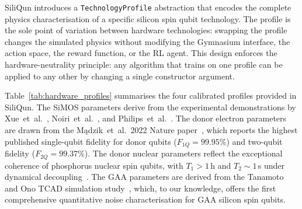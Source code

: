 SiliQun introduces a \texttt{TechnologyProfile} abstraction that
encodes the complete physics characterisation of a specific silicon spin
qubit technology.
The profile is the sole point of variation between hardware technologies:
swapping the profile changes the simulated physics without modifying the
Gymnasium interface, the action space, the reward function, or the RL
agent.
This design enforces the hardware-neutrality principle: any algorithm
that trains on one profile can be applied to any other by changing a
single constructor argument.

Table~\ref{tab:hardware_profiles} summarises the four calibrated profiles
provided in SiliQun.
The SiMOS parameters derive from the experimental demonstrations by
Xue~et~al.~\cite{Xue2022}, Noiri~et~al.~\cite{Noiri2022}, and
Philips~et~al.~\cite{Philips2022}.
The donor electron parameters are drawn from the M\k{a}dzik~et~al.\ 2022
Nature paper~\cite{Madzik2022}, which reports the highest published
single-qubit fidelity for donor qubits ($F_{1Q} = 99.95\%$) and
two-qubit fidelity ($F_{2Q} = 99.37\%$).
The donor nuclear parameters reflect the exceptional coherence of
phosphorus nuclear spin qubits, with $T_1 > 1$\,h and $T_2 \sim 1$\,s
under dynamical decoupling~\cite{Morello2020}.
The GAA parameters are derived from the Tanamoto and Ono TCAD
simulation study~\cite{Tanamoto2025}, which, to our knowledge, offers
the first comprehensive quantitative noise characterisation for GAA
silicon spin qubits.

\begin{table}[ht]
  \centering
  \caption{SiliQun hardware profile parameters drawn from peer-reviewed sources.
    $T_1$, $T_2$: relaxation and dephasing times.
    $\sigma_\varepsilon$: charge noise amplitude (\textmu eV).
    $\sigma_J$: exchange noise amplitude (MHz).
    $A_{\text{hf}}$: hyperfine coupling (donor profiles only, MHz).
    $p_2$: two-qubit gate error probability.
    $\tau_1$, $\tau_2$: single- and two-qubit gate durations (ns).
    Sources: SiMOS~\cite{Xue2022,Noiri2022,Philips2022};
    donor~\cite{Madzik2022,Morello2020}; GAA~\cite{Tanamoto2025}.}
  \label{tab:hardware_profiles}
\end{table}

